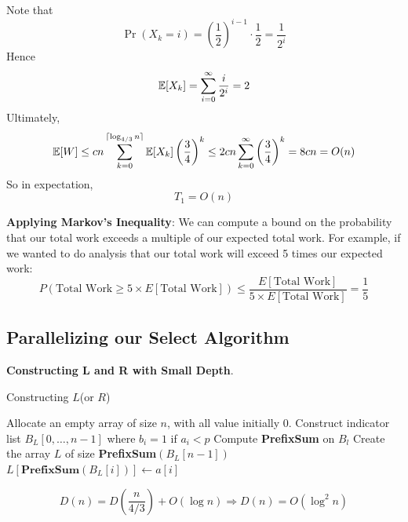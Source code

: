 \documentclass[11pt]{article}
\begin{document}
Note that
\begin{equation*}
\Pr(X_k=i)=\left( \frac{1}{2} \right)^{i-1}\cdot\frac{1}{2}=\frac{1}{2^i}
\end{equation*}
Hence
\begin{equation*}
\mathbb{E}[X_k]=\sum_{i=0}^\infty\frac{i}{2^i}=2
\end{equation*}
Ultimately,
\begin{equation*}
\mathbb{E}[W]\le cn\sum_{k=0}^{\lceil \log_{4/3}n \rceil}\mathbb{E}[X_k]\left( \frac{3}{4} \right)^k\le
2cn\sum_{k=0}^\infty\left( \frac{3}{4} \right)^k=8cn=O(n)
\end{equation*}
So in expectation,
\begin{equation*}
T_1=O(n)
\end{equation*}

\textbf{Applying Markov's Inequality}: We can compute a bound on the probability that our total work
 exceeds a multiple of our expected total work. For example, if we wanted to do analysis that
 our total work will exceed 5 times our expected work:
 \begin{equation*}
P(\text{Total Work}\ge 5\times E[\text{Total Work}])\le\frac{E[\text{Total Work}]}{5\times E[\text{Total Work}]}=\frac{1}{5}
 \end{equation*}
\subsection{Parallelizing our Select Algorithm}
\label{sec:orgc908b1d}
\textbf{Constructing L and R with Small Depth}.

\begin{algorithm}
\caption{Constructing \(L\)(or \(R\))}
\begin{algorithmic}[1]
\State Allocate an empty array of size \(n\), with all value initially 0.
\State Construct indicator list \(B_L[0,\dots,n-1]\) where \(b_i=1\) if \(a_i<p\)
\State Compute \textbf{PrefixSum} on \(B_l\)
\State Create the array \(L\) of size \textbf{PrefixSum}\((B_L[n-1])\)
        \State \(L[\textbf{PrefixSum}(B_L[i])]\leftarrow a[i]\)
    \EndIf
\EndFor
\end{algorithmic}
\end{algorithm}
\begin{equation*}
D(n)=D\left( \frac{n}{4/3} \right)+O(\log n)\Rightarrow D(n)=O(\log^2n)
\end{equation*}
\end{document}
